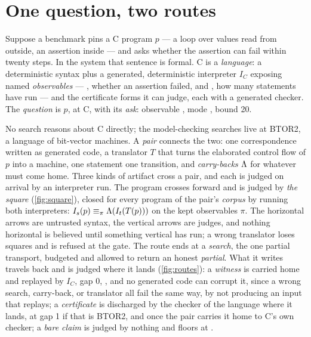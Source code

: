 
\section{One question, two routes}
\label{sec:overview}

Suppose a benchmark pins a C program $p$ --- a loop over values read
from outside, an assertion inside --- and asks whether the assertion
can fail within twenty steps. In the system that sentence is formal.
C is a \emph{language}: a deterministic syntax plus a generated,
deterministic interpreter $I_C$ exposing named \emph{observables} ---
, whether an assertion failed, and , how many
statements have run --- and the certificate forms it can judge, each
with a generated checker. The \emph{question} is $p$, at C, with its
\emph{ask}: observable , mode , bound 20.




No search reasons about C directly; the model-checking searches live
at BTOR2, a language of bit-vector machines. A \emph{pair} connects
the two: one correspondence written as generated code, a translator
$T$ that turns the elaborated control flow of $p$ into a machine, one
statement one transition, and \emph{carry-backs} $\Lambda$ for whatever
must come home. Three kinds of artifact cross a pair, and each is
judged on arrival by an interpreter run. The program crosses forward
and is judged by \emph{the square} (\cref{fig:square}), closed for
every program of the pair's \emph{corpus} by running both
interpreters: $I_s(p) \equiv_\pi \Lambda(I_t(T(p)))$ on the kept
observables $\pi$. The horizontal arrows are untrusted syntax, the
vertical arrows are judges, and nothing horizontal is believed until
something vertical has run; a wrong translator loses squares and is
refused at the gate. The route ends at a \emph{search}, the one
partial transport, budgeted and allowed to return an honest
\emph{partial}. What it writes travels back and is judged where it
lands (\cref{fig:routes}): a \emph{witness} is carried home and
replayed by $I_C$, gap 0, , and no generated code can
corrupt it, since a wrong search, carry-back, or translator all fail
the same way, by not producing an input that replays; a
\emph{certificate} is discharged by the checker of the language where
it lands,  at gap 1 if that is BTOR2, and
 once the pair carries it home to C's own checker; a
\emph{bare claim} is judged by nothing and floors at .

